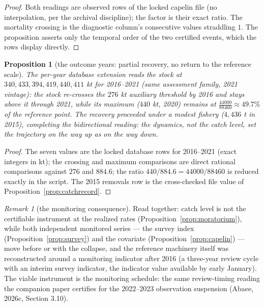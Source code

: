\documentclass[10pt,twocolumn]{article}
\theoremstyle{plain}
\newtheorem{proposition}[theorem]{Proposition}
\theoremstyle{remark}
\newtheorem{remark}[theorem]{Remark}
\begin{document}
\begin{proof}
Both readings are observed rows of the locked capelin file (no
interpolation, per the archival discipline); the factor is their exact
ratio. The mortality crossing is the diagnostic column's consecutive
values straddling \(1\). The proposition asserts only the temporal
order of the two certified events, which the rows display directly.
\end{proof}

\begin{proposition}[the outcome years: partial recovery, no return to
the reference scale]\label{prop:recovery}
The per-year database extension reads the stock at \(340, 433, 394,
419, 440, 411\) kt for 2016--2021 (same assessment family, 2021
vintage): the stock re-crosses the \(276\) kt auxiliary threshold by
2016 and stays above it through 2021, while its maximum (\(440\) kt,
2020) remains at \(\tfrac{44000}{88460} \approx 49.7\%\) of the
reference point. The recovery proceeded under a modest fishery
(\(4{,}436\) t in 2015), completing the bidirectional reading: the
dynamics, not the catch level, set the trajectory on the way up as on
the way down.
\end{proposition}

\begin{proof}
The seven values are the locked database rows for 2016--2021 (exact
integers in kt); the crossing and maximum comparisons are direct
rational comparisons against \(276\) and \(884.6\); the ratio
\(440/884.6 = 44000/88460\) is reduced exactly in the script. The 2015
removals row is the cross-checked file value of
Proposition~\ref{prop:catchrecord}.
\end{proof}

\begin{remark}[the monitoring consequence]\label{rem:monitoring}
Read together: catch level is not the certifiable instrument at the
realized rates (Proposition~\ref{prop:moratorium}), while both
independent monitored series --- the survey index
(Proposition~\ref{prop:survey}) and the covariate
(Proposition~\ref{prop:capelin}) --- move before or with the collapse,
and the reference machinery itself was reconstructed around a
monitoring indicator after 2016 (a three-year review cycle with an
interim survey indicator, the indicator value available by early
January). The viable instrument is the monitoring schedule: the same
review-timing reading the companion paper certifies for the 2022--2023
observation suspension (Abaee, 2026c, Section 3.10).
\end{remark}
\end{document}
